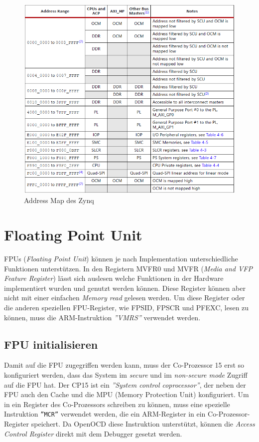 \begin{figure}[htbp]
	\centering
		\includegraphics[width=14cm,height=\textheight,keepaspectratio]{images/AddressMapZynq.png}
	\caption[]{Address Map des Zynq}
	\label{fig:AddressMapZynq}
\end{figure}


\section{Floating Point Unit}
FPUs (\textit{Floating Point  Unit}) können je nach Implementation unterschiedliche Funktionen unterstützen.
In den Registern MVFR0 und MVFR (\textit{Media and VFP Feature Register}) lässt sich auslesen welche Funktionen in der Hardware implementiert wurden und genutzt werden können.
Diese Register können aber nicht mit einer einfachen \textit{Memory read} gelesen werden.
Um diese Register oder die anderen speziellen FPU-Register, wie FPSID, FPSCR und PFEXC, lesen zu können, muss die ARM-Instruktion \textit{''VMRS''} verwendet werden.

\subsection{FPU initialisieren}
Damit auf die FPU zugegriffen werden kann, muss der Co-Prozessor 15 erst so konfiguriert werden, dass das System im \textit{secure} und im \textit{non-secure mode} Zugriff auf die FPU hat.
Der CP15 ist ein \textit{''System control coprocessor''}, der neben der FPU auch den Cache und die MPU (Memory Protection Unit) konfiguriert.
Um in ein Register des Co-Prozessors schreiben zu können, muss eine spezielle Instruktion \texttt{''MCR''} verwendet werden, die ein ARM-Register in ein Co-Prozessor-Register speichert.
Da OpenOCD diese Instruktion unterstützt, können die \textit{Access Control Register} direkt mit dem Debugger gesetzt werden.

